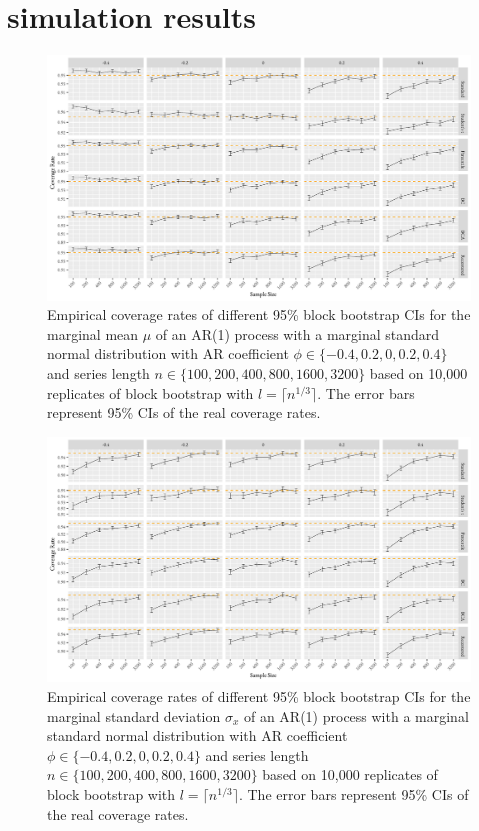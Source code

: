 \documentclass[10pt]{article}
\begin{document}
\section*{simulation results}
\label{sec:simres}



\begin{figure}[tbp]
  \centering
  \includegraphics[width=\textwidth]{figures/plot_norm_mu_1}
  \caption{Empirical coverage rates of different 95\% block bootstrap CIs for
    the marginal mean $\mu$ of an AR(1) process with a marginal standard 
    normal distribution with AR coefficient
    $\phi \in \{-0.4, 0.2, 0, 0.2, 0.4\}$ and series length
    $n \in \{100, 200, 400, 800, 1600, 3200\}$ based on 10,000 replicates of
    block bootstrap with $l = \lceil n^{1/3} \rceil$. The
    error bars represent 95\% CIs of the real coverage rates.}
  \label{fig:mu1}
\end{figure}


\begin{figure}[bp]
  \centering
  \includegraphics[width=\textwidth]{figures/plot_norm_sigma_1}
  \caption{Empirical coverage rates of different 95\% block bootstrap CIs for
    the marginal standard deviation $\sigma_x$ of an AR(1) process with a
    marginal standard normal distribution with AR 
    coefficient $\phi \in \{-0.4, 0.2, 0, 0.2, 0.4\}$ and series length 
    $n \in \{100, 200, 400, 800, 1600, 3200\}$ based on 10,000 replicates of
    block bootstrap with $l = \lceil n^{1/3} \rceil$. The 
    error bars represent 95\% CIs of the real coverage rates.}
  \label{fig:sigma1}
\end{figure}
\end{document}

